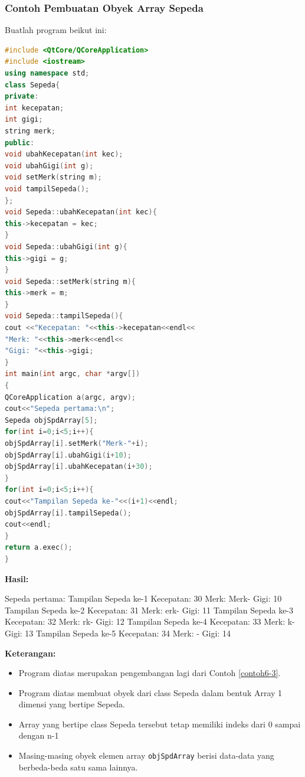 \subsubsection*{Contoh  Pembuatan Obyek Array Sepeda}

Buatlah program beikut ini:

\begin{lstlisting}[language=c++, caption=Pembuatan Obyek Array Sepeda, label=contoh6-3]
#include <QtCore/QCoreApplication>
#include <iostream>
using namespace std;
class Sepeda{
private:
int kecepatan;
int gigi;
string merk;
public:
void ubahKecepatan(int kec);
void ubahGigi(int g);
void setMerk(string m);
void tampilSepeda();
};
void Sepeda::ubahKecepatan(int kec){
this->kecepatan = kec;
}
void Sepeda::ubahGigi(int g){
this->gigi = g;
}
void Sepeda::setMerk(string m){
this->merk = m;
}
void Sepeda::tampilSepeda(){
cout <<"Kecepatan: "<<this->kecepatan<<endl<<
"Merk: "<<this->merk<<endl<<
"Gigi: "<<this->gigi;
}
int main(int argc, char *argv[])
{
QCoreApplication a(argc, argv);
cout<<"Sepeda pertama:\n";
Sepeda objSpdArray[5];
for(int i=0;i<5;i++){
objSpdArray[i].setMerk("Merk-"+i);
objSpdArray[i].ubahGigi(i+10);
objSpdArray[i].ubahKecepatan(i+30);
}
for(int i=0;i<5;i++){
cout<<"Tampilan Sepeda ke-"<<(i+1)<<endl;
objSpdArray[i].tampilSepeda();
cout<<endl;
}
return a.exec();
}
\end{lstlisting}

\textbf{Hasil:}
\begin{lcverbatim}
Sepeda pertama:
Tampilan Sepeda ke-1
Kecepatan: 30
Merk: Merk-
Gigi: 10
Tampilan Sepeda ke-2
Kecepatan: 31
Merk: erk-
Gigi: 11
Tampilan Sepeda ke-3
Kecepatan: 32
Merk: rk-
Gigi: 12
Tampilan Sepeda ke-4
Kecepatan: 33
Merk: k-
Gigi: 13
Tampilan Sepeda ke-5
Kecepatan: 34
Merk: -
Gigi: 14
\end{lcverbatim}

\textbf{Keterangan:}

\begin{itemize}

\item
  Program diatas merupakan pengembangan lagi dari Contoh \ref{contoh6-3}.
\item
  Program diatas membuat obyek dari class Sepeda dalam bentuk Array 1
  dimensi yang bertipe Sepeda.
\item
  Array yang bertipe class Sepeda tersebut tetap memiliki indeks dari 0
  sampai dengan n-1
\item
  Masing-masing obyek elemen array \texttt{objSpdArray} berisi data-data
  yang berbeda-beda satu sama lainnya.
\end{itemize}

